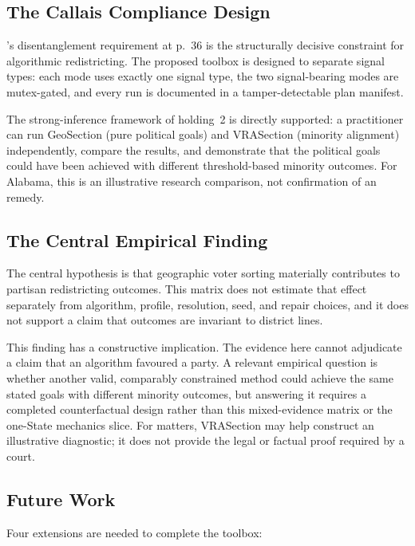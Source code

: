 \subsection{The Callais Compliance Design}

\callais{}'s disentanglement requirement at p.~36 is the structurally decisive
constraint for algorithmic redistricting.
The proposed toolbox is designed to separate signal types: each mode uses exactly one signal type,
the two signal-bearing modes are mutex-gated, and every run is documented in
a tamper-detectable plan manifest.

The strong-inference framework of \callais{} holding~2 is directly supported:
a practitioner can run GeoSection (pure political goals) and VRASection (minority
alignment) independently, compare the results, and demonstrate that the political
goals could have been achieved with different threshold-based minority outcomes.
For Alabama, this is an illustrative research comparison, not confirmation of
an \allenmilligan{} remedy.

\subsection{The Central Empirical Finding}

The central hypothesis is that geographic voter sorting materially contributes
to partisan redistricting outcomes. This matrix does not estimate that effect
separately from algorithm, profile, resolution, seed, and repair choices, and it
does not support a claim that outcomes are invariant to district lines.

This finding has a constructive implication.
The evidence here cannot adjudicate a claim that an algorithm favoured a party.
A relevant empirical question is whether another valid, comparably constrained
method could achieve the same stated goals with different minority outcomes,
but answering it requires a completed counterfactual design rather than this
mixed-evidence matrix or the one-State mechanics slice.
For \allenmilligan{} matters, VRASection may help construct an illustrative
diagnostic; it does not provide the legal or factual proof required by a court.

\subsection{Future Work}

Four extensions are needed to complete the toolbox:

